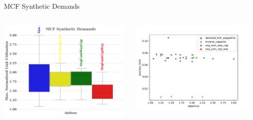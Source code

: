 \documentclass[aspectratio=169,10pt]{beamer}
\begin{document}
\begin{frame}{MCF Synthetic Demands}
\begin{columns}
\begin{column}{0.5\paperwidth}
\begin{center}
\includegraphics[width=\textwidth]{images/pouria_all_algorithms_abilene.pdf}
\end{center}
\end{column}
\hfill
\begin{column}{0.5\paperwidth}
\begin{center}
\includegraphics[width=\textwidth]{images/pouria_colored_scatter_plot_results_all_algorithms.pdf}
\end{center}
\end{column}
\end{columns}
\end{frame}
\end{document}
